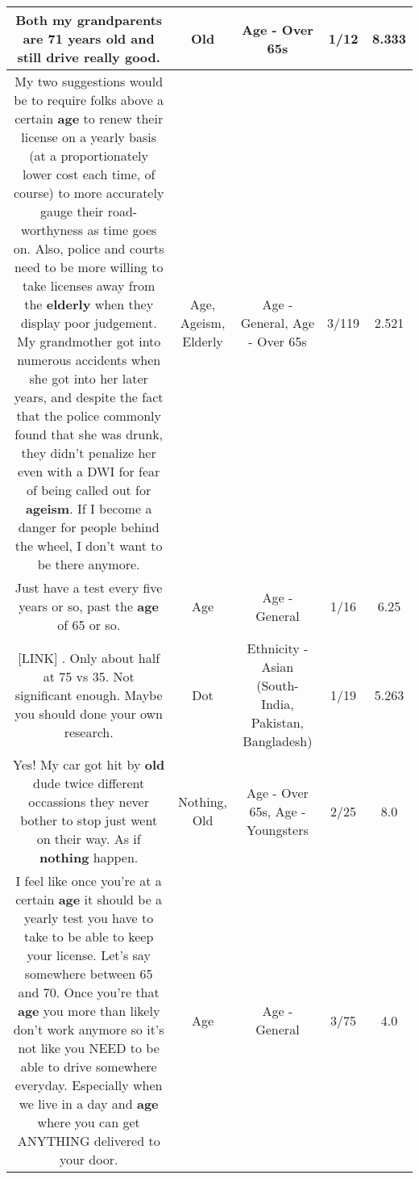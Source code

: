 \documentclass[11pt]{article}
\newlength\mylength
\begin{document}
\begin{center}
\begin{longtable}{|C{.65\mylength}|C{.30\mylength}|C{.12\mylength}|C{.12\mylength}|C{.12\mylength}|}
  \small Both my grandparents are 71 years \textbf{old} and still drive really good.\normalsize   & Old & Age - Over 65s & 1/12 & 8.333 \\  \hline
  \small My two suggestions would be to require folks above a certain \textbf{age} to renew their license on a yearly basis (at a proportionately lower cost each time, of course) to more accurately gauge their road-worthyness as time goes on. Also, police and courts need to be more willing to take licenses away from the \textbf{elderly} when they display poor judgement. My grandmother got into numerous accidents when she got into her later years, and despite the fact that the police commonly found that she was drunk, they didn't penalize her even with a DWI for fear of being called out for \textbf{ageism}. If I become a danger for people behind the wheel, I don't want to be there anymore.\normalsize   & Age, Ageism, Elderly & Age - General, Age - Over 65s & 3/119 & 2.521 \\  \hline
  \small Just have a test every five years or so, past the \textbf{age} of 65 or so.\normalsize   & Age & Age - General & 1/16 & 6.25 \\  \hline
  \small  [LINK]  . Only about half at 75 vs 35. Not significant enough. Maybe you should done your own research.\normalsize   & Dot & Ethnicity - Asian (South- India, Pakistan, Bangladesh) & 1/19 & 5.263 \\  \hline
  \small Yes! My car got hit by \textbf{old} dude twice different occassions  they never bother to stop just went on their way. As if \textbf{nothing} happen.\normalsize   & Nothing, Old & Age - Over 65s, Age - Youngsters & 2/25 & 8.0 \\  \hline
  \small I feel like once you're at a certain \textbf{age} it should be a yearly test you have to take to be able to keep your license. Let's say somewhere between 65 and 70. Once you're that \textbf{age} you more than likely don't work anymore so it's not like you NEED to be able to drive somewhere everyday. Especially when we live in a day and \textbf{age} where you can get ANYTHING delivered to your door.\normalsize   & Age & Age - General & 3/75 & 4.0 \\  \hline

\end{longtable}
\end{center}
\end{document}
